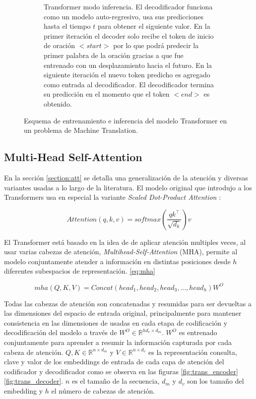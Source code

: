 \begin{figure}[ht!]
\begin{subfigure}[b]{0.49\textwidth}
        \caption{Transformer modo inferencia. El decodificador funciona como un modelo auto-regresivo,
        usa sus predicciones hasta el tiempo $t$ para obtener el siguiente valor. En la primer iteración
        el decoder solo recibe el token de inicio de oración $<start>$ por lo que podrá predecir la primer
        palabra de la oración gracias a que fue entrenado con un desplazamiento hacia el futuro. En la siguiente
        iteración el nuevo token predicho es agregado como entrada al decodificador. El decodificador
        termina su predicción en el momento que el token $<end>$ es obtenido.}
        \label{fig:trans_eval}
    \end{subfigure}
    \caption{Esquema de entrenamiento e inferencia del modelo Transformer en un problema de
             Machine Translation.}
        \label{fig:trans_te}
\end{figure}


\subsection{Multi-Head Self-Attention} \label{section-mha}

En la sección \ref{section:att} se detalla una generalización de la atención y diversas variantes
usadas a lo largo de la literatura. El modelo original que introdujo a los Transformers usa en
especial la variante \textit{Scaled Dot-Product Attention} \cite{Vaswani}:


\begin{equation}
    Attention(q, k, v) = softmax(\frac{q k^\top}{\sqrt{d_k}}) v
    \label{eq:trans_att_gen}
\end{equation}

El Transformer está basado en la idea de de aplicar atención multiples veces, al usar varias cabezas
de atención, \textit{Multihead-Self-Attention} (MHA), permite  al modelo conjuntamente atender a información
en distintas posiciones desde $h$ diferentes subespacios de representación. \ref{eq:mha}

\begin{equation}
    mha(Q, K, V) = Concat(head_1,head_2,head_3,..., head_h)W^O
    \label{eq:mha}
\end{equation}

Todas las cabezas de atención son concatenadas y resumidas para ser devueltas a las dimensiones del
espacio de entrada original, principalmente para mantener consistencia en las dimensiones de usadas
en cada etapa de codificación y decodificación del modelo a través de $W^O \in \mathbb{R}^{hd_v \times d_m}$.
$W^O$ es entrenado conjuntamente para aprender a resumir la información capturada por cada cabeza de
atención. $Q, K \in \mathbb{R}^{n \times d_{m}}$ y $V \in \mathbb{R}^{n \times d_{v}}$ es la representación
consulta, clave y valor de los embeddings de entrada de cada capa de atención del codificador y
decodificador como se observa en las figuras \ref{fig:trans_encoder} \ref{fig:trans_decoder}.
$n$ es el tamaño de la secuencia, $d_m$ y $d_v$ son los tamaño del embedding y $h$ el número de
cabezas de atención.

